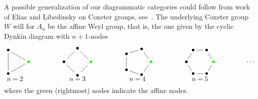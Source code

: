 \begin{rem}\label{rem-possibleextension}
A possible 
generalization of our diagrammatic categories could follow from work of 
Elias and Libedinsky on Coxeter groups, 
see~\cite{el2}. The
underlying Coxeter group $W$ will for $A_n$ be the affine Weyl group, that is, the one given by the cyclic Dynkin diagram with $n+1$-nodes
\[
\xy 0;/r.17pc/:
(-5,8.66)*+{\bullet}="1";
(-5,-8.66)*+{\bullet}="2";
(10,0)*+{{\color{green}\bullet}}="3";
{\ar@{-} "1";"2" };
{\ar@{-} "2";"3" };
{\ar@{-} "3";"1" };
(0,-12.5)*{n=2};
\endxy\hspace*{1.5cm}
\xy 0;/r.17pc/:
(0,10)*+{\bullet}="1";
(-10,0)*+{\bullet}="2";
(0,-10)*+{\bullet}="3";
(10,0)*+{{\color{green}\bullet}}="4";
{\ar@{-} "1";"2" };
{\ar@{-} "2";"3" };
{\ar@{-} "3";"4" };
{\ar@{-} "4";"1" };
(0,-12.5)*{n=3};
\endxy\hspace*{1.5cm}
\xy 0;/r.17pc/:
(3.09,9.51)*+{\bullet}="1";
(-8.09,5.88)*+{\bullet}="2";
(-8.09,-5.88)*+{\bullet}="3";
(3.09,-9.51)*+{\bullet}="4";
(10,0)*+{{\color{green}\bullet}}="5";
{\ar@{-} "1";"2" };
{\ar@{-} "2";"3" };
{\ar@{-} "3";"4" };
{\ar@{-} "4";"5" };
{\ar@{-} "1";"5" };
(0,-12.5)*{n=4};
\endxy\hspace*{1.5cm}
\xy 0;/r.17pc/:
(5,8.66)*+{\bullet}="1";
(-5,8.66)*+{\bullet}="2";
(-10,0)*+{\bullet}="3";
(-5,-8.66)*+{\bullet}="4";
(5,-8.66)*+{\bullet}="5";
(10,0)*+{{\color{green}\bullet}}="6";
{\ar@{-} "1";"2" };
{\ar@{-} "2";"3" };
{\ar@{-} "3";"4" };
{\ar@{-} "4";"5" };
{\ar@{-} "5";"6" };
{\ar@{-} "1";"6" };
(0,-12.5)*{n=5};
\endxy\hspace*{1.5cm}\cdots
\]
where the green (rightmost) nodes indicate the affine nodes.
\end{rem}
